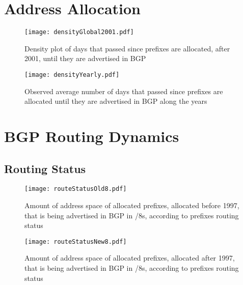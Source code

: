 \documentclass[11pt,a4paper]{scrreprt}
\begin{document}
\begin{appendices}
\section{Address Allocation}

\begin{figure}[!h]
\centering
\texttt{[image: densityGlobal2001.pdf]}
\caption{Density plot of days that passed since prefixes are allocated, after 2001, until they are advertised in BGP}
\label{fig:densityGlobal2001}
\end{figure}


\begin{figure}[!h]
\centering
\texttt{[image: densityYearly.pdf]}
\caption{Observed average number of days that passed since prefixes are allocated until they are advertised in BGP along the years}
\label{fig:densityYearly}
\end{figure}


\section{BGP Routing Dynamics}

\subsection{Routing Status}

\begin{figure}[!h]
\centering
\texttt{[image: routeStatusOld8.pdf]}
\caption{Amount of address space of allocated prefixes, allocated before 1997, that is being advertised in BGP in /8s, according to prefixes routing status}
\label{fig:routingStatusOld8}
\end{figure}

\begin{figure}[!h]
\centering
\texttt{[image: routeStatusNew8.pdf]}
\caption{Amount of address space of allocated prefixes, allocated after 1997, that is being advertised in BGP in /8s, according to prefixes routing status}
\label{fig:routingStatusNew8}
\end{figure}


\end{appendices}
\end{document}
